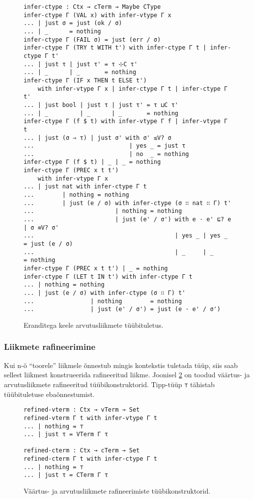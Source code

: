 \documentclass[a4paper,12pt]{article}
\begin{document}
\begin{figure}
  \begin{BVerbatim}
infer-ctype : Ctx → cTerm → Maybe CType
infer-ctype Γ (VAL x) with infer-vtype Γ x
... | just σ = just (ok / σ)
... | _      = nothing
infer-ctype Γ (FAIL σ) = just (err / σ)
infer-ctype Γ (TRY t WITH t') with infer-ctype Γ t | infer-ctype Γ t'
... | just τ | just τ' = τ ⊹C τ'
... | _      | _       = nothing
infer-ctype Γ (IF x THEN t ELSE t')
    with infer-vtype Γ x | infer-ctype Γ t | infer-ctype Γ t'
... | just bool | just τ | just τ' = τ ⊔C τ'
... | _         | _      | _       = nothing
infer-ctype Γ (f $ t) with infer-vtype Γ f | infer-vtype Γ t
... | just (σ ⇒ τ) | just σ' with σ' ≤V? σ
...                           | yes _ = just τ
...                           | no  _ = nothing
infer-ctype Γ (f $ t) | _ | _ = nothing
infer-ctype Γ (PREC x t t')
    with infer-vtype Γ x
... | just nat with infer-ctype Γ t
...        | nothing = nothing
...        | just (e / σ) with infer-ctype (σ ∷ nat ∷ Γ) t'
...                       | nothing = nothing
...                       | just (e' / σ') with e · e' ⊑? e | σ ≡V? σ'
...                                        | yes _ | yes _ = just (e / σ)
...                                        | _     | _     = nothing
infer-ctype Γ (PREC x t t') | _ = nothing
infer-ctype Γ (LET t IN t') with infer-ctype Γ t 
... | nothing = nothing
... | just (e / σ) with infer-ctype (σ ∷ Γ) t'
...                | nothing        = nothing
...                | just (e' / σ') = just (e · e' / σ')
  \end{BVerbatim}
  \caption{Eranditega keele arvutusliikmete tüübituletus.}
  \label{fig:exc.infer-ctype}
\end{figure}

\subsubsection{Liikmete rafineerimine}

Kui n-ö ``toorele'' liikmele õnnestub mingis kontekstis tuletada tüüp, siis saab sellest liikmest konstrueerida rafineeritud liikme.
Joonisel \ref{fig:exc.infer-term-type} on toodud väärtus- ja arvutusliikmete rafineeritud tüübikonstruktorid.
Tipp-tüüp {\tt ⊤} tähistab tüübituletuse ebaõnnestumist.
\begin{figure}
  \begin{BVerbatim}
refined-vterm : Ctx → vTerm → Set
refined-vterm Γ t with infer-vtype Γ t 
... | nothing = ⊤
... | just τ = VTerm Γ τ

refined-cterm : Ctx → cTerm → Set
refined-cterm Γ t with infer-ctype Γ t 
... | nothing = ⊤
... | just τ = CTerm Γ τ
  \end{BVerbatim}
  \caption{Väärtus- ja arvutusliikmete rafineerimiste tüübikonstruktorid.}
  \label{fig:exc.infer-term-type}
\end{figure}
\end{document}
